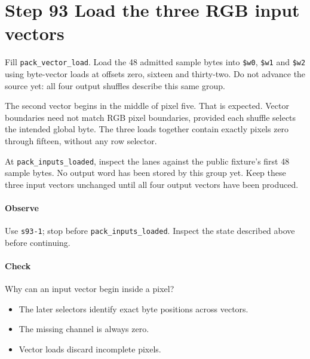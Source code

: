 \section{Step 93 Load the three RGB input vectors}
Fill \texttt{pack\_vector\_load}. Load the 48 admitted sample bytes into \texttt{\$w0}, \texttt{\$w1} and \texttt{\$w2} using byte-vector loads at offsets zero, sixteen and thirty-two. Do not advance the source yet: all four output shuffles describe this same group.

The second vector begins in the middle of pixel five. That is expected. Vector boundaries need not match RGB pixel boundaries, provided each shuffle selects the intended global byte. The three loads together contain exactly pixels zero through fifteen, without any row selector.

At \texttt{pack\_inputs\_loaded}, inspect the lanes against the public fixture’s first 48 sample bytes. No output word has been stored by this group yet. Keep these three input vectors unchanged until all four output vectors have been produced.

\paragraph{Observe} Use \texttt{s93-1}; stop before \texttt{pack\_inputs\_loaded}. Inspect the state described above before continuing.

\paragraph{Check} Why can an input vector begin inside a pixel?
\begin{itemize}
\item[A.] The later selectors identify exact byte positions across vectors.
\item[B.] The missing channel is always zero.
\item[C.] Vector loads discard incomplete pixels.
\end{itemize}
